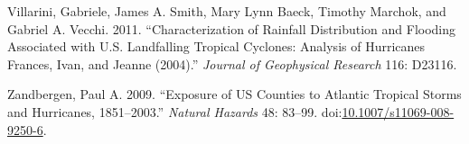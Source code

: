 \documentclass[]{elsarticle} %
\begin{document}
\hypertarget{ref-Villarini2011}{}
Villarini, Gabriele, James A. Smith, Mary Lynn Baeck, Timothy Marchok,
and Gabriel A. Vecchi. 2011. ``Characterization of Rainfall Distribution
and Flooding Associated with U.S. Landfalling Tropical Cyclones:
Analysis of Hurricanes Frances, Ivan, and Jeanne (2004).'' \emph{Journal
of Geophysical Research} 116: D23116.

\hypertarget{ref-Zandbergen2009}{}
Zandbergen, Paul A. 2009. ``Exposure of US Counties to Atlantic Tropical
Storms and Hurricanes, 1851--2003.'' \emph{Natural Hazards} 48: 83--99.
doi:\href{https://doi.org/10.1007/s11069-008-9250-6}{10.1007/s11069-008-9250-6}.
\end{document}
